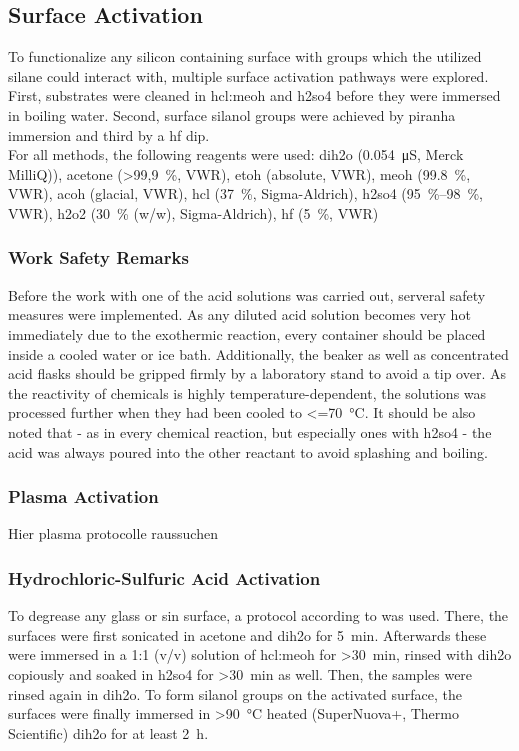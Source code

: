 \subsection{Surface Activation}
To functionalize any silicon containing surface with  groups which the utilized silane could interact with, multiple surface activation pathways were explored. First, substrates were cleaned in \gls{hcl}:\gls{meoh} and \gls{h2so4} before they were immersed in boiling water. Second, surface silanol groups were achieved by piranha immersion and third by a \gls{hf} dip.\\
For all methods, the following reagents were used: \gls{dih2o} (\SI{0,054}{\micro\siemens}, Merck MilliQ)), acetone (\SI{>99,9}{\percent}, VWR), \gls{etoh} (absolute, VWR), \gls{meoh} (\SI{99.8}{\percent}, VWR), \gls{acoh} (glacial, VWR), \gls{hcl} (\SI{37}{\percent}, Sigma-Aldrich), \gls{h2so4} (\SIrange{95}{98}{\percent}, VWR), \gls{h2o2} (\SI{30}{\percent} (w/w), Sigma-Aldrich), \gls{hf} (\SI{5}{\percent}, VWR)

\subsubsection{Work Safety Remarks}
Before the work with one of the acid solutions was carried out, serveral safety measures were implemented. As any diluted acid solution becomes very hot immediately due to the exothermic reaction, every container should be placed inside a cooled water or ice bath. Additionally, the beaker as well as concentrated acid flasks should be gripped firmly by a laboratory stand to avoid a tip over. As the reactivity of chemicals is highly temperature-dependent, the solutions was processed further when they had been cooled to \SI{<=70}{\degreeCelsius}. It should be also noted that - as in every chemical reaction, but especially ones with \gls{h2so4} - the acid was always poured into the other reactant to avoid splashing and boiling.

\subsubsection{Plasma Activation}

Hier plasma protocolle raussuchen

\subsubsection{Hydrochloric-Sulfuric Acid Activation}
To degrease any glass or \gls{sin} surface, a protocol according to \citet{lit:chem:Dressick} was used. There, the surfaces were first sonicated in acetone and \gls{dih2o}  for \SI{5}{\minute}. Afterwards these were immersed in a 1:1 (v/v) solution of \gls{hcl}:\gls{meoh} for \SI{>30}{\minute}, rinsed with \gls{dih2o} copiously and soaked in \gls{h2so4} for \SI{>30}{\minute} as well. Then, the samples were rinsed again in \acrlong{dih2o}. To form silanol groups on the activated surface, the surfaces were finally immersed in \SI{>90}{\degreeCelsius} heated (SuperNuova+, Thermo Scientific) \gls{dih2o}  for at least \SI{2}{\hour}.
